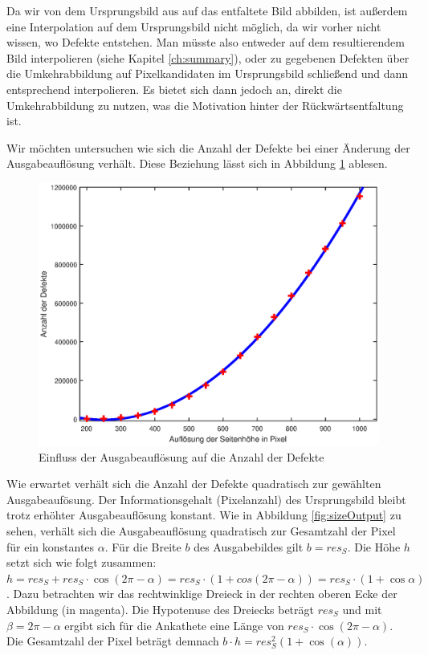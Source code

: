 Da wir von dem Ursprungsbild aus auf das entfaltete Bild abbilden, ist außerdem eine Interpolation auf dem Ursprungsbild nicht möglich, da wir vorher nicht wissen, wo Defekte entstehen. Man müsste also entweder auf dem resultierendem Bild interpolieren (siehe Kapitel \ref{ch:summary}), oder zu gegebenen Defekten über die Umkehrabbildung auf Pixelkandidaten im Ursprungsbild schließend und dann entsprechend interpolieren. 
Es bietet sich dann jedoch an, direkt die Umkehrabbildung zu nutzen, was die Motivation hinter der Rückwärtsentfaltung ist.

Wir möchten untersuchen wie sich die Anzahl der Defekte bei einer Änderung der Ausgabeauflösung verhält. Diese Beziehung lässt sich in Abbildung \ref{fig:influenceRes} ablesen. 
\begin{figure}[!htb]
	\centering
	\includegraphics[width=\textwidth]{images/numberOfHoles.eps}
	\caption{Einfluss der Ausgabeauflösung auf die Anzahl der Defekte}
	\label{fig:influenceRes}
\end{figure}

Wie erwartet verhält sich die Anzahl der Defekte quadratisch zur gewählten Ausgabeaufösung. Der Informationsgehalt (Pixelanzahl) des Ursprungsbild bleibt trotz erhöhter Ausgabeauflösung konstant. Wie in Abbildung \ref{fig:sizeOutput} zu sehen, verhält sich die Ausgabeauflösung quadratisch zur Gesamtzahl der Pixel für ein konstantes $\alpha$. Für die Breite $b$ des Ausgabebildes gilt $b = res_S$. 
Die Höhe $h$ setzt sich wie folgt zusammen: $h = res_S + res_S\cdot\cos(2\pi-\alpha) = res_S\cdot(1 + cos(2\pi-\alpha)) = res_S\cdot(1+\cos\alpha)$. Dazu betrachten wir das rechtwinklige Dreieck in der rechten oberen Ecke der Abbildung (in magenta). Die Hypotenuse des Dreiecks beträgt $res_S$ und mit $\beta = 2\pi - \alpha$ ergibt sich für die Ankathete eine Länge von $res_S\cdot\cos(2\pi-\alpha)$. Die Gesamtzahl der Pixel beträgt demnach $b\cdot h = res_S^2(1+\cos(\alpha))$.

